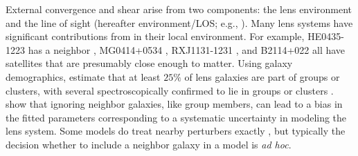 External convergence and shear arise from two components: the lens environment and the line of sight (hereafter environment/LOS; e.g., \citealt{Jaroszynski14,Seljak94,Bar-Kana96,Keeton97}). Many lens systems have significant contributions from in their local environment. For example, HE0435-1223 has a neighbor \citep{Kochanek06}, MG0414+0534 \citep{Tonry99}, RXJ1131-1231 \citep{Sluse03}, and B2114+022 \citep{King99} all have satellites that are presumably close enough to matter. Using galaxy demographics, \citet{Keeton00} estimate that at least $25\%$ of lens galaxies are part of groups or clusters, with several spectroscopically confirmed to lie in groups or clusters \citep[][and references therein]{Momcheva06}. \citet{Keeton04} show that ignoring neighbor galaxies, like group members, can lead to a bias in the fitted  parameters corresponding to a systematic uncertainty in modeling the lens system. Some models do treat nearby perturbers exactly \citep[e.g.][]{Fadely12}, but typically the decision whether to include a neighbor galaxy in a model is \textit{ad hoc}.
  
  